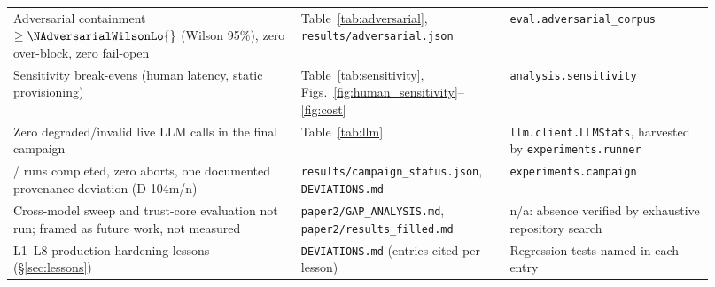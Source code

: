 \begin{table}[t]
\begin{tabular}{@{}p{0.38\linewidth}p{0.27\linewidth}p{0.27\linewidth}@{}}
Adversarial containment $\geq\NAdversarialWilsonLo{}$ (Wilson 95\%), zero over-block, zero fail-open &
  Table~\ref{tab:adversarial}, \texttt{results/\allowbreak adversarial.json} &
  \texttt{eval.adversarial\_corpus} \\
Sensitivity break-evens (human latency, static provisioning) &
  Table~\ref{tab:sensitivity}, Figs.~\ref{fig:human_sensitivity}--\ref{fig:cost} &
  \texttt{analysis.sensitivity} \\
Zero degraded/invalid live LLM calls in the final campaign &
  Table~\ref{tab:llm} &
  \texttt{llm.client.LLMStats}, harvested by \texttt{experiments.runner} \\
\NRunsTotal{}/\NRunsTotal{} runs completed, zero aborts, one documented provenance deviation (D-104m/n) &
  \texttt{results/\allowbreak campaign\_status.json}, \texttt{DEVIATIONS.md} &
  \texttt{experiments.campaign} \\
Cross-model sweep and trust-core evaluation not run; framed as future work, not measured &
  \texttt{paper2/\allowbreak GAP\_ANALYSIS.md}, \texttt{paper2/\allowbreak results\_filled.md} &
  n/a: absence verified by exhaustive repository search \\
L1--L8 production-hardening lessons (\S\ref{sec:lessons}) &
  \texttt{DEVIATIONS.md} (entries cited per lesson) &
  Regression tests named in each entry \\
\bottomrule
\end{tabular}
\end{table}
